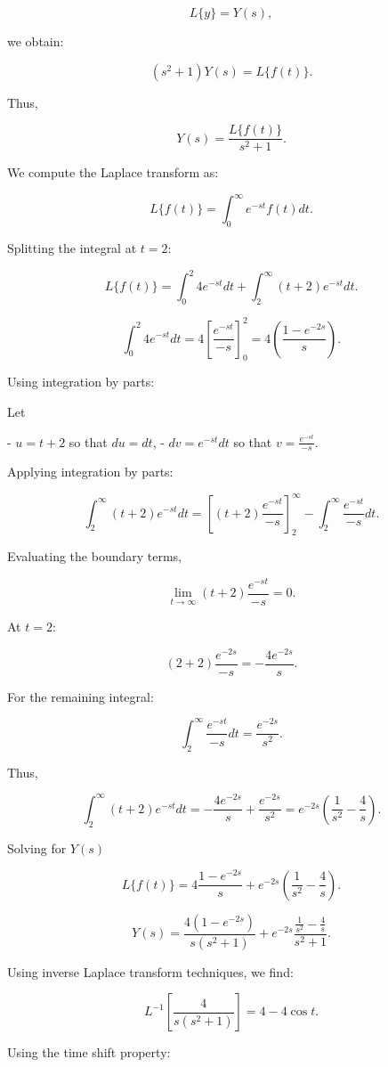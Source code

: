 \documentclass[12pt]{article}
\begin{document}
\begin{enumerate}
\[
L\{y\} = Y(s),
\]

we obtain:

\[
(s^2 + 1) Y(s) = L\{f(t)\}.
\]

Thus,

\[
Y(s) = \frac{L\{f(t)\}}{s^2 + 1}.
\]


We compute the Laplace transform as:

\[
L\{f(t)\} = \int_0^\infty e^{-st} f(t) dt.
\]

Splitting the integral at \( t = 2 \):

\[
L\{f(t)\} = \int_0^2 4 e^{-st} dt + \int_2^\infty (t+2) e^{-st} dt.
\]


\[
\int_0^2 4 e^{-st} dt = 4 \left[ \frac{e^{-st}}{-s} \right]_0^2 = 4 \left( \frac{1 - e^{-2s}}{s} \right).
\]

Using integration by parts:

Let

- \( u = t+2 \) so that \( du = dt \),
- \( dv = e^{-st} dt \) so that \( v = \frac{e^{-st}}{-s} \).

Applying integration by parts:

\[
\int_2^\infty (t+2) e^{-st} dt = \left[ (t+2) \frac{e^{-st}}{-s} \right]_2^\infty - \int_2^\infty \frac{e^{-st}}{-s} dt.
\]

Evaluating the boundary terms,

\[
\lim_{t \to \infty} (t+2) \frac{e^{-st}}{-s} = 0.
\]

At \( t = 2 \):

\[
(2+2) \frac{e^{-2s}}{-s} = -\frac{4e^{-2s}}{s}.
\]

For the remaining integral:

\[
\int_2^\infty \frac{e^{-st}}{-s} dt = \frac{e^{-2s}}{s^2}.
\]

Thus,

\[
\int_2^\infty (t+2) e^{-st} dt = -\frac{4e^{-2s}}{s} + \frac{e^{-2s}}{s^2} = e^{-2s} \left( \frac{1}{s^2} - \frac{4}{s} \right).
\]

Solving for \( Y(s) \)

\[
L\{f(t)\} = 4 \frac{1 - e^{-2s}}{s} + e^{-2s} \left( \frac{1}{s^2} - \frac{4}{s} \right).
\]

\[
Y(s) = \frac{4(1 - e^{-2s})}{s(s^2+1)} + e^{-2s} \frac{\frac{1}{s^2} - \frac{4}{s}}{s^2+1}.
\]

Using inverse Laplace transform techniques, we find:

\[
L^{-1} \left[ \frac{4}{s(s^2+1)} \right] = 4 - 4\cos t.
\]

Using the time shift property:


\end{enumerate}
\end{document}
